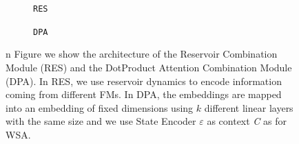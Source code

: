 \begin{figure}[ht]
    \centering
    \begin{subfigure}[b]{0.47\textwidth}
        \centering
        \fbox{\rule[-.5cm]{0cm}{4cm} \rule[-.5cm]{4cm}{0cm}}
        \caption{\texttt{RES}}
        \label{fig:reservoir_combination}
    \end{subfigure}
    \hfill
    \begin{subfigure}[b]{0.47\textwidth}
        \centering
        \fbox{\rule[-.5cm]{0cm}{4cm} \rule[-.5cm]{4cm}{0cm}}
        \caption{\texttt{DPA}}
        \label{fig:dpa}
    \end{subfigure}

    \caption{n Figure we show the architecture of the Reservoir Combination Module (RES) and the DotProduct Attention Combination Module (DPA). In RES, we use reservoir dynamics to encode information coming from different FMs. In DPA, the embeddings are mapped into an embedding of fixed dimensions using $k$ different linear layers with the same size and we use State Encoder $\varepsilon$ as context \textit{C} as for WSA.}
    \label{fig:dpa_combination}
\end{figure}

